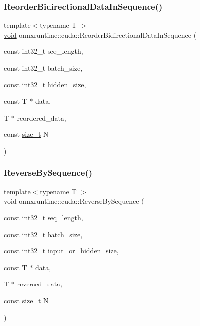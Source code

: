\subsubsection{\texorpdfstring{Reorder\+Bidirectional\+Data\+In\+Sequence()}{ReorderBidirectionalDataInSequence()}}
{\footnotesize\ttfamily template$<$typename T $>$ \\
\mbox{\hyperlink{mlasi_8h_a88f941d423cb2a819b70a1358982b1a6}{void}} onnxruntime\+::cuda\+::\+Reorder\+Bidirectional\+Data\+In\+Sequence (\begin{DoxyParamCaption}\item[{const int32\+\_\+t}]{seq\+\_\+length,  }\item[{const int32\+\_\+t}]{batch\+\_\+size,  }\item[{const int32\+\_\+t}]{hidden\+\_\+size,  }\item[{const T $\ast$}]{data,  }\item[{T $\ast$}]{reordered\+\_\+data,  }\item[{const \mbox{\hyperlink{mlasi_8h_a503efbc1c6e50825320ad909366b78ab}{size\+\_\+t}}}]{N }\end{DoxyParamCaption})}

\mbox{\label{namespaceonnxruntime_1_1cuda_a50c0e5c797779509d0ec1d12b475f238}} 
\subsubsection{\texorpdfstring{Reverse\+By\+Sequence()}{ReverseBySequence()}}
{\footnotesize\ttfamily template$<$typename T $>$ \\
\mbox{\hyperlink{mlasi_8h_a88f941d423cb2a819b70a1358982b1a6}{void}} onnxruntime\+::cuda\+::\+Reverse\+By\+Sequence (\begin{DoxyParamCaption}\item[{const int32\+\_\+t}]{seq\+\_\+length,  }\item[{const int32\+\_\+t}]{batch\+\_\+size,  }\item[{const int32\+\_\+t}]{input\+\_\+or\+\_\+hidden\+\_\+size,  }\item[{const T $\ast$}]{data,  }\item[{T $\ast$}]{reversed\+\_\+data,  }\item[{const \mbox{\hyperlink{mlasi_8h_a503efbc1c6e50825320ad909366b78ab}{size\+\_\+t}}}]{N }\end{DoxyParamCaption})}

